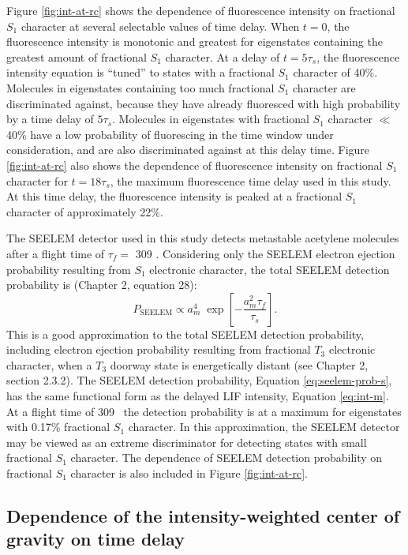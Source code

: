 \documentclass[12pt]{mitthesis}
\begin{document}
Figure \ref{fig:int-at-rc} shows the dependence of fluorescence
intensity on fractional $S_1$ character at several selectable
values of time delay.  When $t = 0$, the fluorescence intensity is
monotonic and greatest for eigenstates containing the greatest amount
of fractional $S_1$ character.  At a delay of $t = 5 \tau_s$,
the fluorescence intensity equation is ``tuned'' to states with a
fractional $S_1$ character of 40\%.  Molecules in eigenstates
containing too much fractional $S_1$ character are
discriminated against, because they have already fluoresced with high
probability by a time delay of $5 \tau_s$.  Molecules in eigenstates
with fractional $S_1$ character $\ll$ 40\% have a low
probability of fluorescing in the time window under consideration, and
are also discriminated against at this delay time.  Figure
\ref{fig:int-at-rc} also shows the dependence of fluorescence
intensity on fractional $S_1$ character for $t=18\tau_s$, the
maximum fluorescence time delay used in this study.  At this time
delay, the fluorescence intensity is peaked at a fractional $S_1$
character of approximately 22\%.

The SEELEM detector used in this study detects metastable acetylene
molecules after a flight time of $\tau_f =$ 309
\microsec.  Considering only the SEELEM electron ejection probability
resulting from $S_1$ electronic character, the total SEELEM detection
probability is (Chapter 2, equation 28):
\begin{equation}
  \label{eq:seelem-prob-s}
  P_{\text{SEELEM}} \propto 
    a_m^4 \; 
    \exp \left [ 
      -\frac{a_m^2 \tau_f}{\tau_s} 
    \right ].
\end{equation}
This is a good approximation to the total SEELEM detection
probability, including electron ejection probability resulting from
fractional $T_3$ electronic character, when a $T_3$ doorway state is
energetically distant (see Chapter 2, section 2.3.2).  The SEELEM
detection probability, Equation \ref{eq:seelem-prob-s}, has the same
functional form as the delayed LIF intensity, Equation \ref{eq:int-m}.
At a flight time of 309 \microsec\, the detection probability is at a
maximum for eigenstates with 0.17\% fractional $S_1$ character.  In
this approximation, the SEELEM detector may be viewed as an extreme
discriminator for detecting states with small fractional $S_1$
character.  The dependence of SEELEM detection probability on
fractional $S_1$ character is also included in Figure
\ref{fig:int-at-rc}.




\subsection{Dependence of the intensity-weighted center of gravity on
  time delay}
\end{document}
